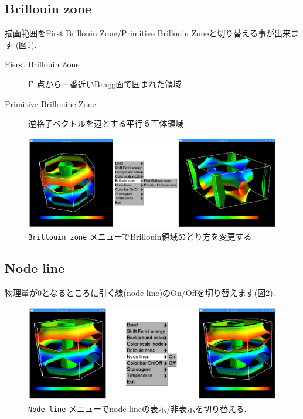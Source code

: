 \documentclass[12pt]{jarticle}
\begin{document}
\subsection{Brillouin zone}

描画範囲をFirst Brillouin Zone/Primitive Brillouin Zoneと切り替える事が出来ます
(図\ref{fig_brillouinzone}).
\begin{description}
\item[Fisrst Brillouin Zone] ${\rm \Gamma}$ 点から一番近いBragg面で囲まれた領域
\item[Primitive Brillouine Zone] 逆格子ベクトルを辺とする平行６面体領域
\end{description}

\begin{figure}[!ht]
  \includegraphics[width=17cm]{figs/brillouinzone.eps}
  \caption{\texttt{Brillouin zone} メニューでBrillouin領域のとり方を変更する.}
  \label{fig_brillouinzone}
\end{figure}

\subsection{Node line}

物理量が0となるところに引く線(node line)のOn/Offを切り替えます(図\ref{fig_nodeline}).

\begin{figure}[!ht]
  \includegraphics[width=17cm]{figs/nodeline.eps}
  \caption{\texttt{Node line} メニューでnode lineの表示/非表示を切り替える.}
  \label{fig_nodeline}
\end{figure}
\end{document}
